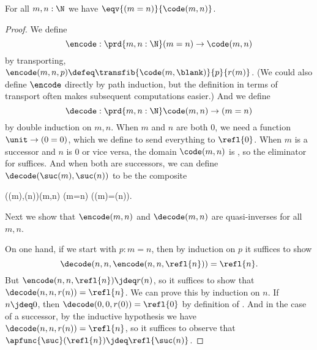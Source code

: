 \begin{thm}\label{thm:path-nat}
  For all $m,n:\N$ we have $\eqv{(m=n)}{\code(m,n)}$.
\end{thm}
\begin{proof}
  We define
  \[ \encode : \prd{m,n:\N} (m=n) \to \code(m,n) \]
  by transporting, $\encode(m,n,p) \defeq \transfib{\code(m,{\blank})}{p}{r(m)}$.
  (We could also define $\encode$ directly by path induction, but the definition in terms of transport often makes subsequent computations easier.)
  And we define
  \[ \decode : \prd{m,n:\N} \code(m,n) \to (m=n) \]
  by double induction on $m,n$.
  When $m$ and $n$ are both $0$, we need a function $\unit \to (0=0)$, which we define to send everything to $\refl{0}$.
  When $m$ is a successor and $n$ is $0$ or vice versa, the domain $\code(m,n)$ is \emptyt, so the eliminator for \emptyt suffices.
  And when both are successors, we can define $\decode(\suc(m),\suc(n))$ to be the composite
  \begin{narrowmultline*}
    \code(\suc(m),\suc(n))\jdeq\code(m,n)
     \narrowbreak
    (m=n)
    \xrightarrow{\apfunc{\suc}}
    (\suc(m)=\suc(n)).
  \end{narrowmultline*}
  Next we show that $\encode(m,n)$ and $\decode(m,n)$ are quasi-inverses for all $m,n$.

  On one hand, if we start with $p:m=n$, then by induction on $p$ it suffices to show
  \[\decode(n,n,\encode(n,n,\refl{n}))=\refl{n}.\]
  But $\encode(n,n,\refl{n}) \jdeq r(n)$, so it suffices to show that $\decode(n,n,r(n)) =\refl{n}$.
  We can prove this by induction on $n$.
  If $n\jdeq 0$, then $\decode(0,0,r(0)) =\refl{0}$ by definition of \decode.
  And in the case of a successor, by the inductive hypothesis we have $\decode(n,n,r(n)) = \refl{n}$, so it suffices to observe that $\apfunc{\suc}(\refl{n}) \jdeq \refl{\suc(n)}$.


\end{proof}
